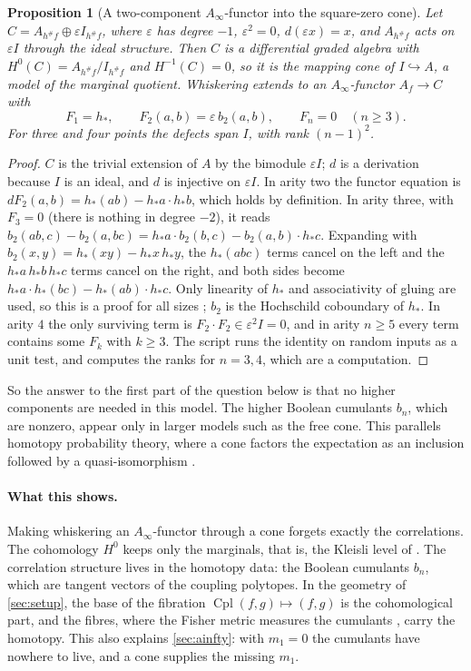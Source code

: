 \documentclass[11pt]{article}
\newtheorem{proposition}[theorem]{Proposition}
\theoremstyle{definition}
\theoremstyle{remark}
\newcommand{\Cpl}{\operatorname{Cpl}}
\begin{document}
\begin{proposition}[A two-component $A_\infty$-functor into the square-zero cone]\label{prop:sqzero}
Let $C=A_{h^\#f}\oplus\varepsilon I_{h^\#f}$, where $\varepsilon$ has degree $-1$, $\varepsilon^2=0$, $d(\varepsilon x)=x$, and
$A_{h^\#f}$ acts on $\varepsilon I$ through the ideal structure. Then $C$ is a differential graded algebra with
$H^0(C)=A_{h^\#f}/I_{h^\#f}$ and $H^{-1}(C)=0$, so it is the mapping cone of $I\hookrightarrow A$, a model of
the marginal quotient. Whiskering extends to an $A_\infty$-functor $A_f\to C$ with
\[
F_1=h_*,\qquad F_2(a,b)=\varepsilon\,b_2(a,b),\qquad F_n=0\quad(n\ge3).
\]
For three and four points the defects span $I$, with rank $(n-1)^2$.
\end{proposition}
\begin{proof}
$C$ is the trivial extension of $A$ by the bimodule $\varepsilon I$; $d$ is a derivation because $I$ is an ideal, and $d$
is injective on $\varepsilon I$. In arity two the functor equation is $dF_2(a,b)=h_*(ab)-h_*a\cdot h_*b$, which holds by
definition. In arity three, with $F_3=0$ (there is nothing in degree $-2$), it reads
$b_2(ab,c)-b_2(a,bc)=h_*a\cdot b_2(b,c)-b_2(a,b)\cdot h_*c$. Expanding with $b_2(x,y)=h_*(xy)-h_*x\,h_*y$, the
$h_*(abc)$ terms cancel on the left and the $h_*a\,h_*b\,h_*c$ terms cancel on the right, and both sides become
$h_*a\cdot h_*(bc)-h_*(ab)\cdot h_*c$. Only linearity of $h_*$ and associativity of gluing are used, so this is a proof for
all sizes \cite[Thm.~5.2]{Conditionals}; $b_2$ is the Hochschild coboundary of $h_*$. In arity $4$ the only surviving term
is $F_2\cdot F_2\in\varepsilon^2I=0$, and in arity $n\ge5$ every term contains some $F_k$ with $k\ge3$. The script runs the
identity on random inputs as a unit test, and computes the ranks for $n=3,4$, which are a computation.
\end{proof}

So the answer to the first part of the question below is that no higher components are needed in this
model. The higher Boolean cumulants $b_n$, which are nonzero, appear only in larger models such as the free
cone. This parallels homotopy probability theory, where a cone factors the expectation as an inclusion
followed by a quasi-isomorphism \cite{HPT1}.

\paragraph{What this shows.} Making whiskering an $A_\infty$-functor through a cone forgets exactly the
correlations. The cohomology $H^0$ keeps only the marginals, that is, the Kleisli level of
\cite{Conditionals}. The correlation structure lives in the homotopy data: the Boolean cumulants $b_n$, which
are tangent vectors of the coupling polytopes. In the geometry of \cref{sec:setup}, the base of the
fibration $\Cpl(f,g)\mapsto(f,g)$ is the cohomological part, and the fibres, where the Fisher metric
measures the cumulants \cite[Prop.~6.5]{Conditionals}, carry the homotopy. This also explains
\cref{sec:ainfty}: with $m_1=0$ the cumulants have nowhere to live, and a cone supplies the missing
$m_1$.
\end{document}
